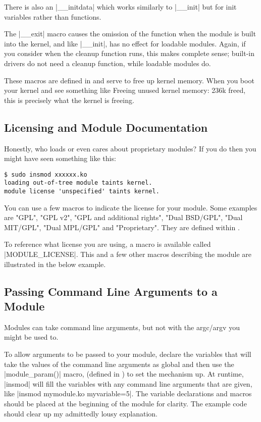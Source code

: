 \documentclass[10pt, oneside]{book}
\begin{document}
There is also an \cpp|__initdata| which works similarly to \cpp|__init| but for init variables rather than functions.

The \cpp|__exit| macro causes the omission of the function when the module is built into the kernel, and like \cpp|__init|, has no effect for loadable modules.
Again, if you consider when the cleanup function runs, this makes complete sense; built-in drivers do not need a cleanup function, while loadable modules do.

These macros are defined in  and serve to free up kernel memory.
When you boot your kernel and see something like Freeing unused kernel memory: 236k freed, this is precisely what the kernel is freeing.


\subsection{Licensing and Module Documentation}
\label{modlicense}
Honestly, who loads or even cares about proprietary modules?
If you do then you might have seen something like this:
\begin{verbatim}
$ sudo insmod xxxxxx.ko
loading out-of-tree module taints kernel.
module license 'unspecified' taints kernel.
\end{verbatim}

You can use a few macros to indicate the license for your module.
Some examples are "GPL", "GPL v2", "GPL and additional rights", "Dual BSD/GPL", "Dual MIT/GPL", "Dual MPL/GPL" and "Proprietary".
They are defined within .

To reference what license you are using, a macro is available called \cpp|MODULE_LICENSE|.
This and a few other macros describing the module are illustrated in the below example.


\subsection{Passing Command Line Arguments to a Module}
\label{modparam}
Modules can take command line arguments, but not with the argc/argv you might be used to.

To allow arguments to be passed to your module, declare the variables that will take the values of the command line arguments as global and then use the \cpp|module_param()| macro, (defined in ) to set the mechanism up.
At runtime, \sh|insmod| will fill the variables with any command line arguments that are given, like \sh|insmod mymodule.ko myvariable=5|.
The variable declarations and macros should be placed at the beginning of the module for clarity.
The example code should clear up my admittedly lousy explanation.
\end{document}
